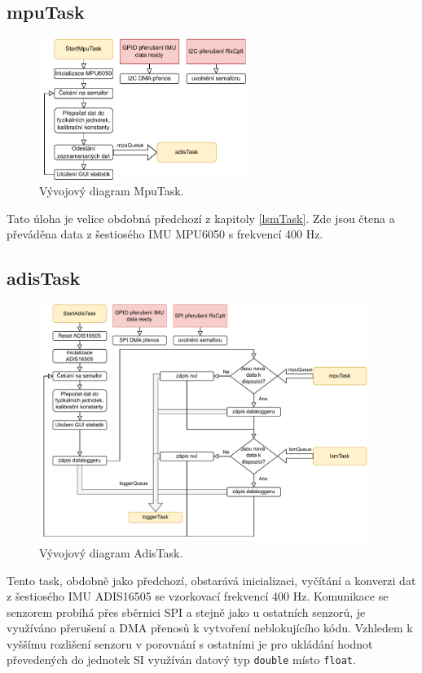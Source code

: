 \subsection{mpuTask}
\begin{figure}[h]
    \centering
    \includegraphics[width=0.6\textwidth]{obrazky/MpuTask}
    \caption{Vývojový diagram MpuTask.}
\end{figure}
Tato úloha je velice obdobná předchozí z kapitoly \ref{lsmTask}. Zde jsou čtena a převáděna data z šestiosého IMU MPU6050 s frekvencí 400 Hz.

\subsection{adisTask}
\begin{figure}[h]
    \centering
    \includegraphics[width=0.95\textwidth]{obrazky/AdisTask}
    \caption{Vývojový diagram AdisTask.}
\end{figure}
Tento task, obdobně jako předchozí, obstarává inicializaci, vyčítání a konverzi dat z šestiosého IMU ADIS16505 se vzorkovací frekvencí 400 Hz. Komunikace se senzorem probíhá přes sběrnici SPI a stejně jako u ostatních senzorů, je využíváno přerušení a DMA přenosů k vytvoření neblokujícího kódu. Vzhledem k vyššímu rozlišení senzoru v porovnání s ostatními je pro ukládání hodnot převedených do jednotek SI využíván datový typ \texttt{double} místo \texttt{float}.

